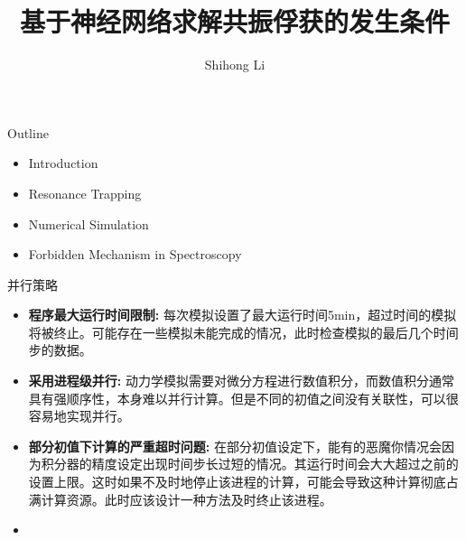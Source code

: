 \documentclass{beamer}		%
\date{}	%
\title[Resonance trapping]{基于神经网络求解共振俘获的发生条件}	%
\author[S Li]{Shihong Li} %
\institute[ZJU]{Zhejiang University} %
\begin{document}


\begin{frame}	

\titlepage	%
	
\end{frame}		


\begin{frame}{Outline}	%
    \begin{itemize}
        \item Introduction
        \item Resonance Trapping
        \item Numerical Simulation
        \item Forbidden Mechanism in Spectroscopy
    \end{itemize}
\end{frame}

\begin{frame}{并行策略}
    \begin{itemize}
        \item \textbf{程序最大运行时间限制:} 每次模拟设置了最大运行时间5min，超过时间的模拟将被终止。可能存在一些模拟未能完成的情况，此时检查模拟的最后几个时间步的数据。
        \item \textbf{采用进程级并行:} 动力学模拟需要对微分方程进行数值积分，而数值积分通常具有强顺序性，本身难以并行计算。但是不同的初值之间没有关联性，可以很容易地实现并行。
        \item \textbf{部分初值下计算的严重超时问题:} 在部分初值设定下，能有的恶魔你情况会因为积分器的精度设定出现时间步长过短的情况。其运行时间会大大超过之前的设置上限。这时如果不及时地停止该进程的计算，可能会导致这种计算彻底占满计算资源。此时应该设计一种方法及时终止该进程。
        \item 
        
    \end{itemize}
\end{frame}
\end{document}
